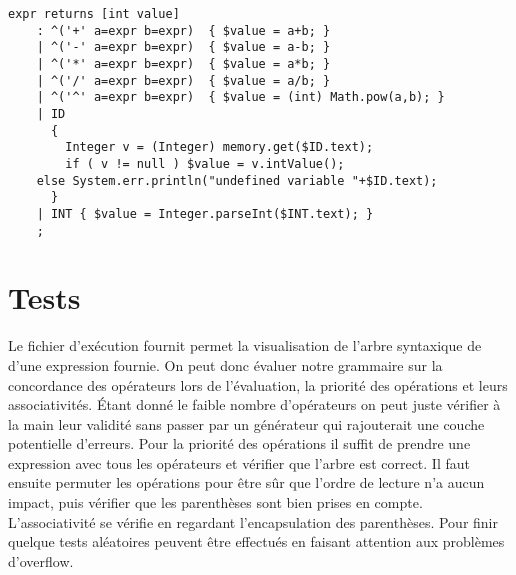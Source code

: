 \documentclass[paper=a4, fontsize=11pt]{scrartcl} %
\numberwithin{equation}{section} %
\numberwithin{figure}{section} %
\numberwithin{table}{section} %
\begin{document}
\begin{lstlisting}[label=eval_file,caption=Fichier Eval.g,
linebackgroundcolor={\lstcolorlines[red!30]{6}\lstcolorlines[green!30]{5}}]
expr returns [int value]
    : ^('+' a=expr b=expr)  { $value = a+b; }
    | ^('-' a=expr b=expr)  { $value = a-b; }
    | ^('*' a=expr b=expr)  { $value = a*b; }
    | ^('/' a=expr b=expr)  { $value = a/b; }
    | ^('^' a=expr b=expr)  { $value = (int) Math.pow(a,b); }
    | ID
      {
        Integer v = (Integer) memory.get($ID.text);
        if ( v != null ) $value = v.intValue();
	else System.err.println("undefined variable "+$ID.text);
      }
    | INT { $value = Integer.parseInt($INT.text); }
    ;
\end{lstlisting}




\section{Tests}

Le fichier d'exécution fournit permet la visualisation de l'arbre syntaxique de
d'une expression fournie. On peut donc évaluer notre grammaire sur la
concordance des opérateurs lors de l'évaluation, la priorité des opérations et
leurs associativités. Étant donné le faible nombre d'opérateurs on peut juste
vérifier à la main leur validité sans passer par un générateur qui rajouterait
une couche potentielle d'erreurs. Pour la priorité des opérations il suffit de
prendre une expression avec tous les opérateurs et vérifier que l'arbre est
correct. Il faut ensuite permuter les opérations pour être sûr que l'ordre de
lecture n'a aucun impact, puis vérifier que les parenthèses sont bien prises en
compte. L'associativité se vérifie en regardant l'encapsulation des parenthèses.
Pour finir quelque tests aléatoires peuvent être effectués en faisant attention
aux problèmes d'overflow.
\end{document}
